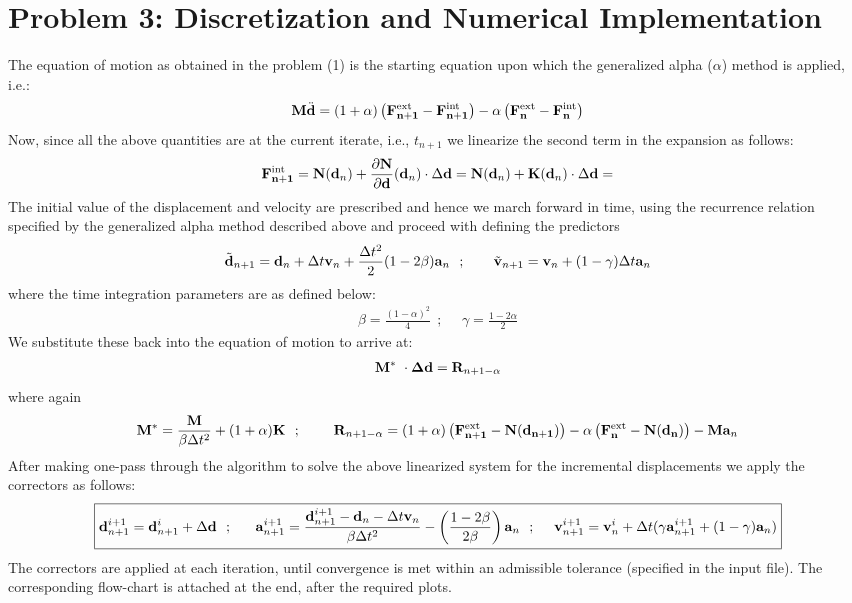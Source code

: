 \section*{Problem 3: Discretization and Numerical Implementation}
The equation of motion as obtained in the problem (1) is the starting equation upon which the generalized alpha ($\alpha$) method is applied, i.e.: 
\begin{align*}
{\bf M} \ddot{\bf d}
=
(1+\alpha)
\left(
\bf\F{n+1}{ext} - \F{n+1}{int}
\right)
- \alpha 
\left(
\bf\F{n}{ext} - \F{n}{int}
\right)
\end{align*}
Now, since all the above quantities are at the current iterate, i.e., $t_{n+1}$ we linearize the second term in the expansion as follows: 
\begin{align*}
{\bf \F{n+1}{int}}
=
{\bf N}({\bf d}_{n})
+
\del{\bf N}{\bf d}({\bf d}_n) \cdot\Delta {\bf d} = 
{\bf N}({\bf d}_{n})
+
{\bf K}({\bf d}_n) \cdot\Delta {\bf d} = 
\end{align*}
The initial value of the displacement and velocity are prescribed and hence we march forward in time, using the recurrence relation specified by the generalized alpha method described above and proceed with defining the predictors 
\begin{align*}
\tilde{\bf d}_{n+1}
=
{\bf d}_{n}
+
\Delta t {\bf v}_n
+ \frac{\Delta t^2}{2} (1-2\beta){\bf a}_n \ \ ; \ \ \ \ \ \ 
\tilde{\bf v}_{n+1}
=
{\bf v}_n
+
(1-\gamma)\Delta t {\bf a}_n
\end{align*}
where the time integration parameters are as defined below: 
\begin{align*}
\beta = \frac{(1-\alpha)^2}{4} \ \ ; \ \ \ \ \ \ \gamma = \frac{1-2\alpha}{2}
\end{align*}
We substitute these back into the equation of motion to arrive at: 
\begin{align*}
{\bf M}^*\ \cdot {\bf \Delta d} = {\bf R}_{n+1-\alpha}
\end{align*}
where again
\begin{align*}
{\bf M}^*
=
\frac{\bf M}{\beta\Delta t^2} + (1+\alpha){\bf K} \ \ ; \ \ \ \ \ \ \ 
{\bf R}_{n+1-\alpha}
=
(1+\alpha)
\left(
\bf\F{n+1}{ext} - {\bf N}({\bf d}_{n+1})
\right)
- \alpha 
\left(
\bf\F{n}{ext} - {\bf N}({\bf d}_n)
\right) - {\bf M} {\bf a}_n
\end{align*}
After making one-pass through the algorithm to solve the above linearized system for the incremental displacements we apply the correctors as follows: 
\begin{align*}
\boxed{{\bf d}^{i+1}_{n+1}
=
{\bf d}^i_{n+1} + \Delta {\bf d} \ \ ; \ \ \ \ \ 
{\bf a}^{i+1}_{n+1}
=
\frac{{\bf d}^{i+1}_{n+1} - {\bf d}_n - \Delta t {\bf v}_n}{\beta\Delta t^2}
-
\left(
\frac{1-2\beta}{2\beta}
\right) {\bf a}_n \ \ ; \ \ \ \ {\bf v}^{i+1}_{n+1}
=
{\bf v}^i_n
+ 
\Delta t
(\gamma {\bf a}^{i+1}_{n+1} + (1-\gamma){\bf a}_n)}
\end{align*}
The correctors are applied at each iteration, until convergence is met within an admissible tolerance (specified in the input file). The corresponding flow-chart is attached at the end, after the required plots. 
